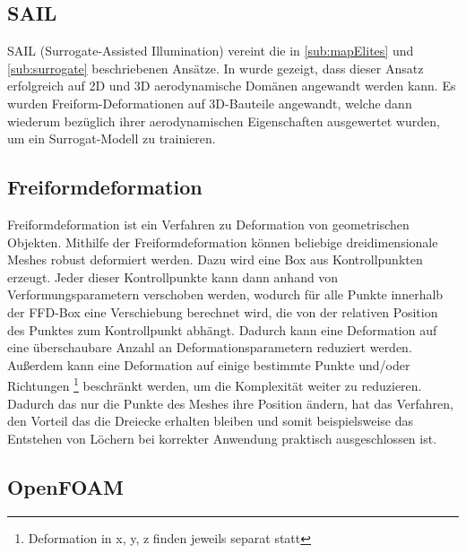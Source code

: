 \subsection{SAIL}

SAIL (Surrogate-Assisted Illumination) vereint die in \ref{sub:mapElites} und \ref{sub:surrogate} beschriebenen Ansätze.
In \cite{Gaier.6152018} wurde gezeigt, dass dieser Ansatz erfolgreich auf 2D und 3D aerodynamische Domänen angewandt werden kann.
Es wurden Freiform-Deformationen auf 3D-Bauteile angewandt, welche dann wiederum bezüglich ihrer aerodynamischen Eigenschaften ausgewertet wurden, um ein Surrogat-Modell zu trainieren.

\subsection{Freiformdeformation}

Freiformdeformation\cite{Sederberg.1986} ist ein Verfahren zu Deformation von geometrischen Objekten.
Mithilfe der Freiformdeformation können beliebige dreidimensionale Meshes robust deformiert werden.
Dazu wird eine Box aus Kontrollpunkten erzeugt.
Jeder dieser Kontrollpunkte kann dann anhand von Verformungsparametern verschoben werden, wodurch für alle Punkte innerhalb der FFD-Box eine Verschiebung berechnet wird, die von der relativen Position des Punktes zum Kontrollpunkt abhängt.
Dadurch kann eine Deformation auf eine überschaubare Anzahl an Deformationsparametern reduziert werden.
Außerdem kann eine Deformation auf einige bestimmte Punkte und/oder Richtungen
\footnote{Deformation in x, y, z finden jeweils separat statt}
beschränkt werden, um die Komplexität weiter zu reduzieren.
Dadurch das nur die Punkte des Meshes ihre Position ändern, hat das Verfahren, den Vorteil das die Dreiecke erhalten bleiben und somit beispielsweise das Entstehen von Löchern bei korrekter Anwendung praktisch ausgeschlossen ist.

\subsection{OpenFOAM}

